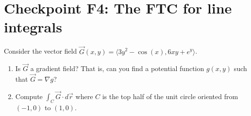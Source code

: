 


%


\allowdisplaybreaks
\section{Checkpoint F4: The FTC for line integrals}

Consider the vector field \(\vec{G}(x,y) = \langle 3y^2 - \cos(x), 6xy+e^y\rangle\).

\begin{enumerate}
    
    \item Is \(\vec{G}\) a gradient field? That is, can you find a potential function $g(x, y)$ such that \(\vec{G} = \nabla g\)?
    \item Compute \(\int_C \vec{G}\cdot d\vec{r}\) where $C$ is the top half of the unit circle oriented from $(-1, 0)$ to $(1, 0)$.
    
\end{enumerate}
    
	
